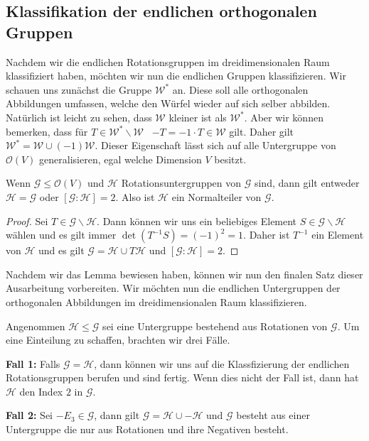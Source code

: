 \subsection{Klassifikation der endlichen orthogonalen Gruppen}
Nachdem wir die endlichen Rotationsgruppen im dreidimensionalen Raum klassifiziert haben, möchten wir nun die endlichen Gruppen klassifizieren. Wir schauen uns zunächst die Gruppe $\mathcal{W}^*$ an. Diese soll alle orthogonalen Abbildungen umfassen, welche den Würfel wieder auf sich selber abbilden. Natürlich ist leicht zu sehen, dass $\mathcal{W}$ kleiner ist als $\mathcal{W}^*$. Aber wir können bemerken, dass für $T \in \mathcal{W}^*\backslash\mathcal{W}$ \ $-T = -1 \cdot T \in \mathcal{W}$ gilt. Daher gilt $\mathcal{W}^*=\mathcal{W}\cup(-1)\mathcal{W}$.
Dieser Eigenschaft lässt sich auf alle Untergruppe von $\mathcal{O}(V)$ generalisieren, egal welche Dimension $V$ besitzt.

\begin{lemma}
    Wenn $\mathcal{G} \leq \mathcal{O}(V)$ und $\mathcal{H}$ Rotationsuntergruppen von $\mathcal{G}$ sind, dann gilt entweder $\mathcal{H}=\mathcal{G}$ oder $[\mathcal{G}:\mathcal{H}] = 2$. Also ist $\mathcal{H}$ ein Normalteiler von $\mathcal{G}$.
\end{lemma}
\begin{proof}
    Sei $T \in \mathcal{G}\backslash\mathcal{H}$. Dann können wir uns ein beliebiges Element $S\in\mathcal{G}\backslash\mathcal{H}$ wählen und es gilt immer $\det(T^{-1}S) = (-1)^2=1$. Daher ist $T^{-1}$ ein Element von $\mathcal{H}$ und es gilt $\mathcal{G} = \mathcal{H} \cup T\mathcal{H}$ und $[\mathcal{G}:\mathcal{H}]=2$.
\end{proof}
Nachdem wir das Lemma bewiesen haben, können wir nun den finalen Satz dieser Ausarbeitung vorbereiten. Wir möchten nun die endlichen Untergruppen der orthogonalen Abbildungen im dreidimensionalen Raum klassifizieren.

Angenommen $\mathcal{H} \leq \mathcal{G}$ sei eine Untergruppe bestehend aus Rotationen von $\mathcal{G}$. Um eine Einteilung zu schaffen, brachten wir drei Fälle.
 
 
 \textbf{Fall 1:} Falls $\mathcal{G} = \mathcal{H}$, dann können wir uns auf die Klassfizierung der endlichen Rotationsgruppen berufen und sind fertig. Wenn dies nicht der Fall ist, dann hat $\mathcal{H}$ den Index $2$ in $\mathcal{G}$.
 
 
 \textbf{Fall 2:} Sei $-E_3 \in \mathcal{G}$, dann gilt $\mathcal{G} = \mathcal{H} \cup - \mathcal{H}$ und $\mathcal{G}$ besteht aus einer Untergruppe die nur aus Rotationen und ihre Negativen besteht.


